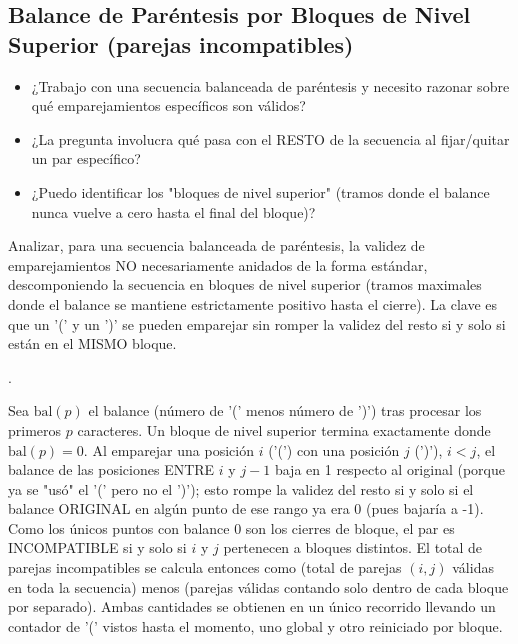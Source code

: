 \subsection{Balance de Paréntesis por Bloques de Nivel Superior (parejas incompatibles)}
\label{alg:3-10}


\begin{itemize}
\item ¿Trabajo con una secuencia balanceada de paréntesis y necesito razonar sobre qué emparejamientos específicos son válidos?
\item ¿La pregunta involucra qué pasa con el RESTO de la secuencia al fijar/quitar un par específico?
\item ¿Puedo identificar los "bloques de nivel superior" (tramos donde el balance nunca vuelve a cero hasta el final del bloque)?
\end{itemize}

 Analizar, para una secuencia balanceada de paréntesis, la validez de emparejamientos NO necesariamente anidados de la forma estándar, descomponiendo la secuencia en bloques de nivel superior (tramos maximales donde el balance se mantiene estrictamente positivo hasta el cierre). La clave es que un '(' y un ')' se pueden emparejar sin romper la validez del resto si y solo si están en el MISMO bloque.

 .

 Sea $\text{bal}(p)$ el balance (número de '(' menos número de ')') tras procesar los primeros $p$ caracteres. Un bloque de nivel superior termina exactamente donde $\text{bal}(p) = 0$. Al emparejar una posición $i$ ('(') con una posición $j$ (')'), $i<j$, el balance de las posiciones ENTRE $i$ y $j-1$ baja en 1 respecto al original (porque ya se "usó" el '(' pero no el ')'); esto rompe la validez del resto si y solo si el balance ORIGINAL en algún punto de ese rango ya era 0 (pues bajaría a -1). Como los únicos puntos con balance 0 son los cierres de bloque, el par es INCOMPATIBLE si y solo si $i$ y $j$ pertenecen a bloques distintos. El total de parejas incompatibles se calcula entonces como (total de parejas $(i,j)$ válidas en toda la secuencia) menos (parejas válidas contando solo dentro de cada bloque por separado). Ambas cantidades se obtienen en un único recorrido llevando un contador de '(' vistos hasta el momento, uno global y otro reiniciado por bloque.


